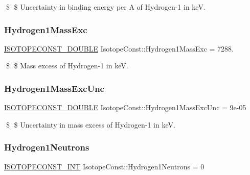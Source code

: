 \$ \$ Uncertainty in binding energy per A of Hydrogen-\/1 in keV. \mbox{\label{group___isotope_const-_hydrogen-_h1_ga708b3bf4d57eb7ffa1f7bc1fd8918136}} 
\subsubsection{\texorpdfstring{Hydrogen1\+Mass\+Exc}{Hydrogen1MassExc}}
{\footnotesize\ttfamily \mbox{\hyperlink{group___isotope_const-_macros_ga8f45a7272ce02c0b4c65c44636ed719a}{I\+S\+O\+T\+O\+P\+E\+C\+O\+N\+S\+T\+\_\+\+D\+O\+U\+B\+LE}} Isotope\+Const\+::\+Hydrogen1\+Mass\+Exc = 7288.}

\$ \$ Mass excess of Hydrogen-\/1 in keV. \mbox{\label{group___isotope_const-_hydrogen-_h1_ga8928cca4d95b1357d15fa4abc01a71de}} 
\subsubsection{\texorpdfstring{Hydrogen1\+Mass\+Exc\+Unc}{Hydrogen1MassExcUnc}}
{\footnotesize\ttfamily \mbox{\hyperlink{group___isotope_const-_macros_ga8f45a7272ce02c0b4c65c44636ed719a}{I\+S\+O\+T\+O\+P\+E\+C\+O\+N\+S\+T\+\_\+\+D\+O\+U\+B\+LE}} Isotope\+Const\+::\+Hydrogen1\+Mass\+Exc\+Unc = 9e-\/05}

\$ \$ Uncertainty in mass excess of Hydrogen-\/1 in keV. \mbox{\label{group___isotope_const-_hydrogen-_h1_ga67383724c2cdf9f6b6de255f72eee169}} 
\subsubsection{\texorpdfstring{Hydrogen1\+Neutrons}{Hydrogen1Neutrons}}
{\footnotesize\ttfamily \mbox{\hyperlink{group___isotope_const-_macros_ga5f18360b3e99483a35c32d789e62621c}{I\+S\+O\+T\+O\+P\+E\+C\+O\+N\+S\+T\+\_\+\+I\+NT}} Isotope\+Const\+::\+Hydrogen1\+Neutrons = 0}

